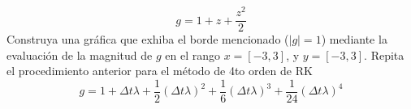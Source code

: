 \documentclass[letterpaper, onecolumn, 11pt]{report}
\begin{document}
\sffamily
%

\begin{equation}
	g = 1+z+\frac{z^2}{2}
\end{equation}
Construya una gráfica que exhiba el borde mencionado ($|g|=1$) mediante la evaluación de la magnitud de $g$ en el rango $x=[-3,3]$, y $y=[-3,3]$. Repita el procedimiento anterior para el método de 4to orden de RK
\begin{equation}
	g = 1+\Delta t\lambda+\frac{1}{2}(\Delta t\lambda)^2+\frac{1}{6}(\Delta t\lambda)^3+\frac{1}{24}(\Delta t\lambda)^4
\end{equation}
\end{document}
